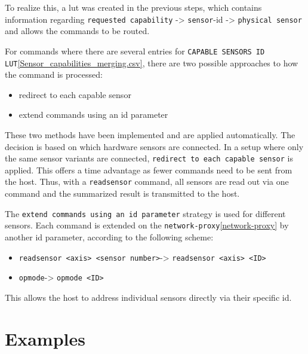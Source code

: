 To realize this, a \gls{lut} was created in the previous steps, which
contains information regarding
\passthrough{\lstinline!requested capability!} -\textgreater{}
\passthrough{\lstinline!sensor!}-\gls{id} -\textgreater{}
\passthrough{\lstinline!physical sensor!} and allows the commands to be
routed.

For commands where there are several entries for
\passthrough{\lstinline!CAPABLE SENSORS ID LUT!}\ref{Sensor_capabilities_merging.csv},
there are two possible approaches to how the command is processed:

\begin{itemize}
\tightlist
\item
  redirect to each capable sensor
\item
  extend commands using an id parameter
\end{itemize}

These two methods have been implemented and are applied automatically.
The decision is based on which hardware sensors are connected. In a
setup where only the same sensor variants are connected,
\passthrough{\lstinline!redirect to each capable sensor!} is applied.
This offers a time advantage as fewer commands need to be sent from the
host. Thus, with a \passthrough{\lstinline!readsensor!} command, all
sensors are read out via one command and the summarized result is
transmitted to the host.

The \passthrough{\lstinline!extend commands using an id parameter!}
strategy is used for different sensors. Each command is extended on the
\passthrough{\lstinline!network-proxy!}\ref{network-proxy} by another
\gls{id} parameter, according to the following scheme:

\begin{itemize}
\tightlist
\item
  \passthrough{\lstinline!readsensor <axis> <sensor number>!}-\textgreater{}
  \passthrough{\lstinline!readsensor <axis> <ID>!}
\item
  \passthrough{\lstinline!opmode!}-\textgreater{}
  \passthrough{\lstinline!opmode <ID>!}
\end{itemize}

This allows the host to address individual sensors directly via their
specific \gls{id}.

\hypertarget{examples}{%
\section{Examples}\label{examples}}

